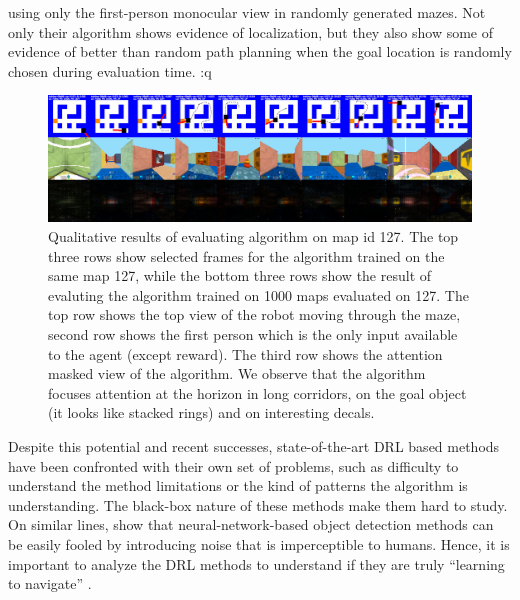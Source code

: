 using only the first-person monocular view in randomly generated mazes. Not only their algorithm shows evidence of localization, but they also show some of evidence of better than random path planning when the goal location is randomly chosen during evaluation time. 
:q

\begin{figure}
\includegraphics[width=\textwidth]{./exp-results/training-09x09-0127-on-0127.png}
\caption{Qualitative results of evaluating algorithm on map id 127. The top three rows show selected frames for the algorithm trained on the same map 127, while the bottom three rows show the result of evaluting the algorithm trained on 1000 maps evaluated on 127. The top row shows the top view of the robot moving through the maze, second row shows the first person which is the only input available to the agent (except reward). The third row shows the attention masked view of the algorithm. We observe that the algorithm focuses attention at the horizon in long corridors, on the goal object (it looks like stacked rings) and on interesting decals.}
\label{fig:training-qualitative}
\end{figure}

Despite this potential and recent successes, 
state-of-the-art DRL based methods have been confronted with their own set of problems, such as difficulty to understand the method limitations or the kind of patterns the algorithm is understanding.  The black-box nature of these methods make them hard to study.
On similar lines, \cite{NgYoClCVPR2015} show that neural-network-based object detection methods can be easily fooled by introducing noise that is imperceptible to humans. Hence, it is important to analyze the DRL methods to understand if they are truly ``learning to navigate'' \cite{MiPaViICLR2017}.

